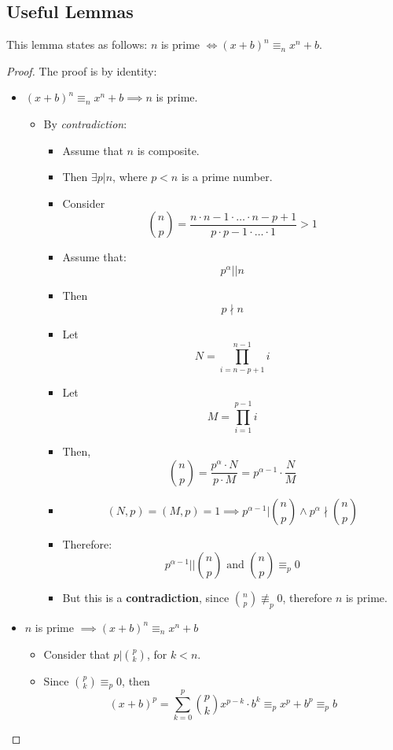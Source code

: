 \subsection{Useful Lemmas}
\begin{lemma}\label{newtown_form_lemma}
    This lemma states as follows:\newline
    $n$ is prime $\iff (x + b)^{n} \equiv_{n} x^{n} + b$.
\end{lemma}
\begin{proof}
    The proof is by identity:
    \begin{itemize}
        \item $(x + b)^{n} \equiv_{n} x^{n} + b \implies n$ is prime.
        \begin{itemize}
            \item By \emph{contradiction}:
            \begin{itemize}
                \item Assume that $n$ is composite.
                \item Then $\exists p | n$, where $p < n$ is a prime number.
                \item Consider \[\binom{n}{p} = \frac{n \cdot n-1 \cdot \dots \cdot n - p + 1}{p \cdot p - 1 \cdot \dots \cdot 1} > 1\]
                \item Assume that: \[p^{\alpha} || n\]
                \item Then \[p \nmid n\]
                \item Let \[N = \prod_{i = n-p+1}^{n-1} i\]
                \item Let \[M = \prod_{i = 1}^{p-1} i\]
                \item Then, \[\binom{n}{p} = \frac{p^{\alpha} \cdot N}{p \cdot M} = p^{\alpha - 1} \cdot \frac{N}{M}\]
                \item \[(N,p) = (M, p) = 1 \implies p^{\alpha - 1} | \binom{n}{p} \land p^{\alpha} \nmid \binom{n}{p}\]
                \item Therefore: \[p^{\alpha - 1} || \binom{n}{p} \text{ and } \binom{n}{p} \equiv_{p} 0\]
                \item But this is a \textbf{contradiction}, since $\binom{n}{p} \not\equiv_{p} 0$, therefore $n$ is prime.
            \end{itemize}

        \end{itemize}
        \item $n$ is prime $\implies (x + b)^{n} \equiv_{n} x^{n} + b$
        \begin{itemize}
            \item Consider that $p | \binom{p}{k}$, for $k < n$.
            \item Since $\binom{p}{k} \equiv_{p} 0$, then
            \[(x + b)^{p} = \sum_{k=0}^{p} \binom{p}{k} x^{p-k} \cdot b^{k} \equiv_{p} x^{p} + b^{p} \equiv_{p} b\]
        \end{itemize}
    \end{itemize}
\end{proof}

